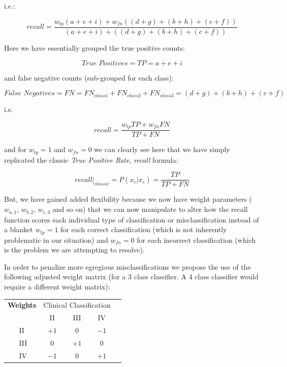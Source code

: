 \documentclass[]{article}
\begin{document}
\noindent i.e.:

\begin{equation}
\textit{recall} = \frac{
	w_{tp}(a + e + i)
	+ 
	w_{fn}((d + g) + (b + h) + (c + f))
}
{(a + e + i) + ((d + g) + (b + h) + (c + f))}
\end{equation}

\noindent Here we have essentially grouped the true positive counts:

\[\textit{True Positives} = {TP} = a + e + i\]

\noindent and false negative counts (sub-grouped for each class):

\[\textit{False Negatives} = {FN} = FN_{class1} + FN_{class2} + FN_{class3} = (d + g) + (b + h) + (c + f)\]

\noindent i.e.

\begin{equation}
\textit{recall} = \frac{
	w_{tp}{TP}
	+ 
	w_{fn}{FN}
}
{{TP} + {FN}}
\end{equation}

\noindent and for $w_{tp} = 1$ and $w_{fn} = 0$ we can clearly see here that we have simply replicated the classic \textit{True Positive Rate}, \textit{recall} formula:

\begin{equation}
\textit{recall}\rvert_{classic} = P(\hat{x_c}|x_c) = \frac{{TP}}{{TP} + {FN}}
\end{equation}

But, we have gained added flexibility because we now have weight parameters ($w_{a,1}$, $w_{b,2}$, $w_{c,3}$ and so on) that we can now manipulate to alter how the recall function scores each individual type of classification or misclassification instead of a blanket $w_{tp} = 1$ for each correct classification (which is not inherently problematic in our situation) and $w_{fn} = 0$ for each incorrect classification (which is the problem we are attempting to resolve). 

In order to penalize more egregious misclassifications we propose the use of the following adjusted weight matrix (for a 3 class classifier. A 4 class classifier would require a different weight matrix):

\begin{center}
	\begin{tabular}{l|l|c|c|c|c}
		\multicolumn{2}{c}{\textbf{Weights}}&\multicolumn{3}{c}{Clinical Classification}\\
		\cline{3-5}
		\multicolumn{2}{c|}{}&II&III&IV\\
		\cline{2-5}
		\multirow{5}{0.8cm}{\rotatebox{90}{\parbox{0.8cm}{\centering Algorithm \\ Classification}}} %
		& II & $+1$ & $0$ & $-1$\\
		\cline{2-5}
		& III & $0$ & $+1$ & $0$\\
		\cline{2-5}
		& IV & $-1$ & $0$ & $+1$\\
		\cline{2-5}
	\end{tabular}
\end{center}
\end{document}
